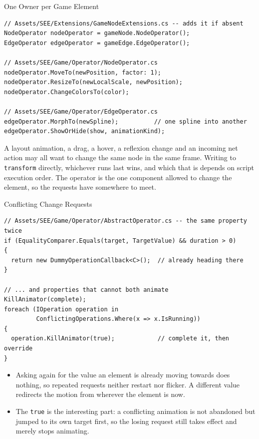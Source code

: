 \begin{frame}[fragile]{One Owner per Game Element}
  \begin{lstlisting}[basicstyle=\scriptsize\ttfamily]
// Assets/SEE/Extensions/GameNodeExtensions.cs -- adds it if absent
NodeOperator nodeOperator = gameNode.NodeOperator();
EdgeOperator edgeOperator = gameEdge.EdgeOperator();

// Assets/SEE/Game/Operator/NodeOperator.cs
nodeOperator.MoveTo(newPosition, factor: 1);
nodeOperator.ResizeTo(newLocalScale, newPosition);
nodeOperator.ChangeColorsTo(color);

// Assets/SEE/Game/Operator/EdgeOperator.cs
edgeOperator.MorphTo(newSpline);          // one spline into another
edgeOperator.ShowOrHide(show, animationKind);
  \end{lstlisting}
  \vspace{1ex}

  A layout animation, a drag, a hover, a reflexion change and an incoming net
  action may all want to change the same node in the same frame. Writing to
  \texttt{transform} directly, whichever runs last wins, and which that is
  depends on script execution order. The operator is the one component allowed
  to change the element, so the requests have somewhere to meet.
\end{frame}

\begin{frame}[fragile]{Conflicting Change Requests}
  \begin{lstlisting}[basicstyle=\scriptsize\ttfamily]
// Assets/SEE/Game/Operator/AbstractOperator.cs -- the same property twice
if (EqualityComparer.Equals(target, TargetValue) && duration > 0)
{
  return new DummyOperationCallback<C>();  // already heading there
}

// ... and properties that cannot both animate
KillAnimator(complete);
foreach (IOperation operation in
         ConflictingOperations.Where(x => x.IsRunning))
{
  operation.KillAnimator(true);            // complete it, then override
}
  \end{lstlisting}
  \vspace{0.5ex}

  \begin{itemize}
    \item Asking again for the value an element is already moving towards does
      nothing, so repeated requests neither restart nor flicker. A different
      value redirects the motion from wherever the element is now.
    \item The \texttt{true} is the interesting part: a conflicting animation is
      not abandoned but jumped to its own target first, so the losing request
      still takes effect and merely stops animating.
  \end{itemize}
\end{frame}

